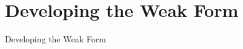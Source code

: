 \documentclass{beamer}
\begin{document}
\section{Developing the Weak Form}
\begin{frame}{Developing the Weak Form}

\end{frame}
\end{document}
